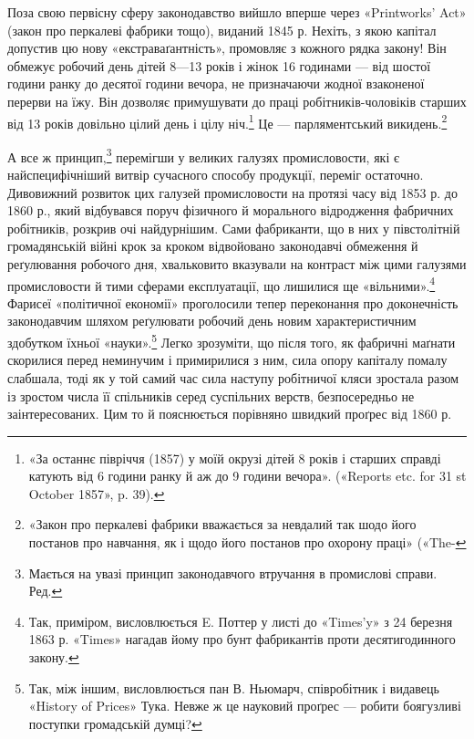 Поза свою первісну сферу законодавство вийшло вперше через
«Printworks’ Act» (закон про перкалеві фабрики тощо), виданий
1845 р. Нехіть, з якою капітал допустив цю нову «екстраваґантність»,
промовляє з кожного рядка закону! Він обмежує
робочий день дітей 8—13 років і жінок 16 годинами — від шостої
години ранку до десятої години вечора, не призначаючи жодної
взаконеної перерви на їжу. Він дозволяє примушувати до праці
робітників-чоловіків старших від 13 років довільно цілий
день і цілу ніч.\footnote{
«За останнє півріччя (1857) у моїй окрузі дітей 8 років і старших
справді катують від 6 години ранку й аж до 9 години вечора». («Reports
etc. for 31 st October 1857», p. 39).
} Це — парляментський викидень.\footnote{
«Закон про перкалеві фабрики вважається за невдалий так шодо його
постанов про навчання, як і щодо його постанов про охорону праці» («The-
}

А все ж принцип,\footnote*{
Мається на увазі принцип законодавчого втручання в промислові
справи. Ред.
} перемігши у великих галузях промисловости,
які є найспецифічніший витвір сучасного способу продукції,
переміг остаточно. Дивовижний розвиток цих галузей промисловости
на протязі часу від 1853 р. до 1860 р., який відбувався
поруч фізичного й морального відродження фабричних робітників,
розкрив очі найдурнішим. Сами фабриканти, що в них у
півстолітній громадянській війні крок за кроком відвойовано
законодавчі обмеження й реґулювання робочого дня, хвальковито
вказували на контраст між цими галузями промисловости
й тими сферами експлуатації, що лишилися ще «вільними».\footnote{
Так, приміром, висловлюється E. Поттер у листі до «Times’y»
з 24 березня 1863 р. «Times» нагадав йому про бунт фабрикантів проти
десятигодинного закону.
}
Фарисеї «політичної економії» проголосили тепер переконання
про доконечність законодавчим шляхом реґулювати робочий день
новим характеристичним здобутком їхньої «науки».\footnote{
Так, між іншим, висловлюється пан В. Ньюмарч, співробітник
і видавець «History of Prices» Тука. Невже ж це науковий проґрес —
робити боягузливі поступки громадській думці?
} Легко
зрозуміти, що після того, як фабричні маґнати скорилися перед
неминучим і примирилися з ним, сила опору капіталу помалу
слабшала, тоді як у той самий час сила наступу робітничої кляси
зростала разом із зростом числа її спільників серед суспільних
верств, безпосередньо не заінтересованих. Цим то й пояснюється
порівняно швидкий проґрес від 1860 р.

